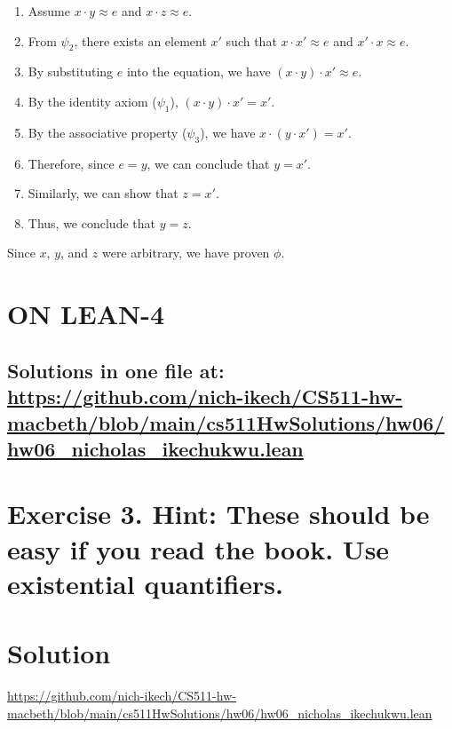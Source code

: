 \documentclass{article}
\newenvironment{proof}
{\begin{mdframed}[linewidth=0.5pt]\begin{enumerate}[label=\arabic*.,leftmargin=*]}
{\end{enumerate}\end{mdframed}}
\begin{document}
\begin{proof}

    \item Assume $x \cdot y \approx e$ and $x \cdot z \approx e$.
    \item From $\psi_2$, there exists an element $x'$ such that $x \cdot x' \approx e$ and $x' \cdot x \approx e$.
    \item By substituting $e$ into the equation, we have $(x \cdot y) \cdot x' \approx e$.
    \item By the identity axiom ($\psi_1$), $(x \cdot y) \cdot x' = x'$.
    \item By the associative property ($\psi_3$), we have $x \cdot (y \cdot x') = x'$.
    \item Therefore, since $e = y$, we can conclude that $y = x'$.
    \item Similarly, we can show that $z = x'$.
    \item Thus, we conclude that $y = z$.

\end{proof}
Since $x$, $y$, and $z$ were arbitrary, we have proven $\phi$.


\newpage







\section*{ON LEAN-4}
\subsection*{Solutions in one file at: 
\url{https://github.com/nich-ikech/CS511-hw-macbeth/blob/main/cs511HwSolutions/hw06/hw06_nicholas_ikechukwu.lean}}

\newpage

\section*{Exercise 3. Hint: These should be easy if you read the book. Use existential quantifiers.}
\section*{Solution}
\url{https://github.com/nich-ikech/CS511-hw-macbeth/blob/main/cs511HwSolutions/hw06/hw06_nicholas_ikechukwu.lean}

\newpage
\end{document}
